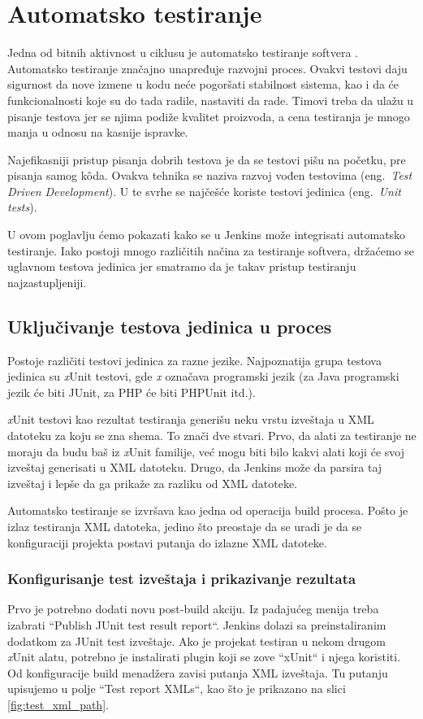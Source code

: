 \section{Automatsko testiranje}
Jedna od bitnih aktivnost u ciklusu je automatsko testiranje softvera \cite{jenkins:2011}. Automatsko testiranje značajno unapređuje razvojni proces. Ovakvi testovi daju sigurnost da nove izmene u kodu neće pogoršati stabilnost sistema, kao i da će funkcionalnosti koje su do tada radile, nastaviti da rade. Timovi treba da ulažu u pisanje testova jer se njima podiže kvalitet proizvoda, a cena testiranja je mnogo manja u odnosu na kasnije ispravke. 

Najefikasniji pristup pisanja dobrih testova je da se testovi pišu na početku, pre pisanja samog k\^oda. Ovakva tehnika se naziva razvoj vođen testovima (eng.~{\em Test Driven Development}). U te svrhe se najčešće koriste testovi jedinica (eng.~{\em Unit tests})\cite{docs:unit}. 

U ovom poglavlju ćemo pokazati kako se u Jenkins može integrisati automatsko testiranje. Iako postoji mnogo različitih načina za testiranje softvera, držaćemo se uglavnom testova jedinica jer smatramo da je takav pristup testiranju najzastupljeniji.

\subsection{Uključivanje testova jedinica u proces}
Postoje različiti testovi jedinica za razne jezike. Najpoznatija grupa testova jedinica su \textit{x}Unit testovi, gde \textit{x} označava programski jezik (za Java programski jezik će biti JUnit, za PHP će biti PHPUnit itd.). 

\textit{x}Unit testovi kao rezultat testiranja generišu neku vrstu izveštaja u XML datoteku za koju se zna shema. To znači dve stvari. Prvo, da alati za testiranje ne moraju da budu baš iz \textit{x}Unit familije, već mogu biti bilo kakvi alati koji će svoj izveštaj generisati u XML datoteku. Drugo, da Jenkins može da parsira taj izveštaj i lepše da ga prikaže za razliku od XML datoteke.

Automatsko testiranje se izvršava kao jedna od operacija build procesa. Pošto je izlaz testiranja XML datoteka, jedino što preostaje da se uradi je da se konfiguraciji projekta postavi putanja do izlazne XML datoteke.

\subsubsection{Konfigurisanje test izveštaja i prikazivanje rezultata}
Prvo je potrebno dodati novu post-build akciju. Iz padajućeg menija treba izabrati ``Publish JUnit test result report``. Jenkins dolazi sa preinstaliranim dodatkom za JUnit test izveštaje. Ako je projekat testiran u nekom drugom \textit{x}Unit alatu, potrebno je instalirati plugin koji se zove ``xUnit`` i njega koristiti. Od konfiguracije build menadžera zavisi putanja XML izveštaja. Tu putanju upisujemo u polje ``Test report XMLs``, kao što je prikazano na slici \ref{fig:test_xml_path}. 

